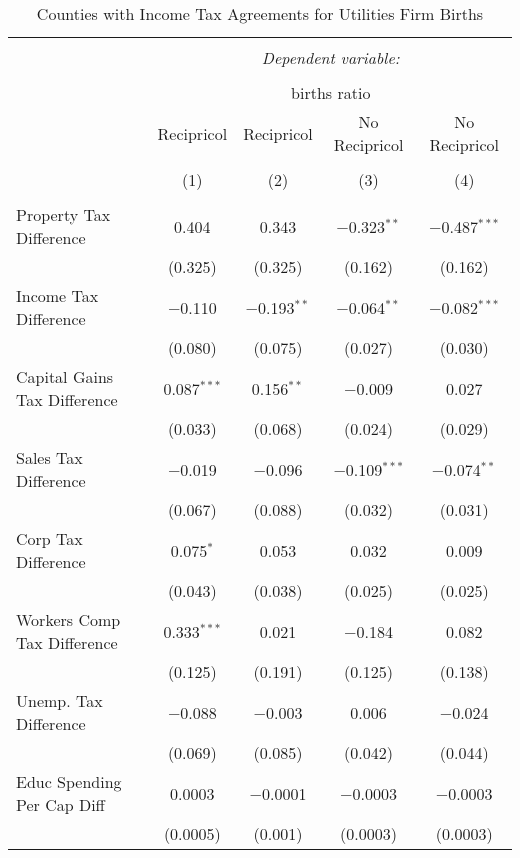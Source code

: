 
\begin{table}[!htbp] \centering 
  \caption{Counties with Income Tax Agreements for  Utilities Firm Births} 
  \label{22rd} 
\begin{tabular}{@{\extracolsep{5pt}}lcccc} 
\\[-1.8ex]\hline 
\hline \\[-1.8ex] 
 & \multicolumn{4}{c}{\textit{Dependent variable:}} \\ 
\cline{2-5} 
\\[-1.8ex] & \multicolumn{4}{c}{births ratio} \\ 
 & Recipricol & Recipricol & No Recipricol & No Recipricol \\ 
\\[-1.8ex] & (1) & (2) & (3) & (4)\\ 
\hline \\[-1.8ex] 
 Property Tax Difference & 0.404 & 0.343 & $-$0.323$^{**}$ & $-$0.487$^{***}$ \\ 
  & (0.325) & (0.325) & (0.162) & (0.162) \\ 
  Income Tax Difference & $-$0.110 & $-$0.193$^{**}$ & $-$0.064$^{**}$ & $-$0.082$^{***}$ \\ 
  & (0.080) & (0.075) & (0.027) & (0.030) \\ 
  Capital Gains Tax Difference & 0.087$^{***}$ & 0.156$^{**}$ & $-$0.009 & 0.027 \\ 
  & (0.033) & (0.068) & (0.024) & (0.029) \\ 
  Sales Tax Difference & $-$0.019 & $-$0.096 & $-$0.109$^{***}$ & $-$0.074$^{**}$ \\ 
  & (0.067) & (0.088) & (0.032) & (0.031) \\ 
  Corp Tax Difference & 0.075$^{*}$ & 0.053 & 0.032 & 0.009 \\ 
  & (0.043) & (0.038) & (0.025) & (0.025) \\ 
  Workers Comp Tax Difference & 0.333$^{***}$ & 0.021 & $-$0.184 & 0.082 \\ 
  & (0.125) & (0.191) & (0.125) & (0.138) \\ 
  Unemp. Tax Difference & $-$0.088 & $-$0.003 & 0.006 & $-$0.024 \\ 
  & (0.069) & (0.085) & (0.042) & (0.044) \\ 
  Educ Spending Per Cap Diff & 0.0003 & $-$0.0001 & $-$0.0003 & $-$0.0003 \\ 
  & (0.0005) & (0.001) & (0.0003) & (0.0003) \\ 

\end{tabular}
\end{table}
